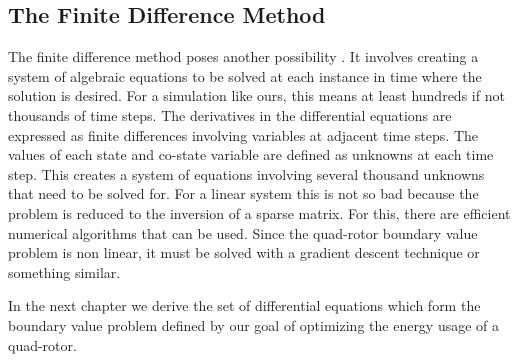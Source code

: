 \subsection{The Finite Difference Method}

The finite difference method poses another possibility \cite{rao2001applied}. It involves creating a system of algebraic equations to be solved at each instance in time where the solution is desired. For a simulation like ours, this means at least hundreds if not thousands of time steps. The derivatives in the differential equations are expressed as finite differences involving variables at adjacent time steps. The values of each state and co-state variable are defined as unknowns at each time step. This creates a system of equations involving several thousand unknowns that need to be solved for. For a linear system this is not so bad because the problem is reduced to the inversion of a sparse matrix. For this, there are efficient numerical algorithms that can be used. Since the quad-rotor boundary value problem is non linear, it must be solved with a gradient descent technique or something similar.

In the next chapter we derive the set of differential equations which form the boundary value problem defined by our goal of optimizing the energy usage of a quad-rotor.  

    


